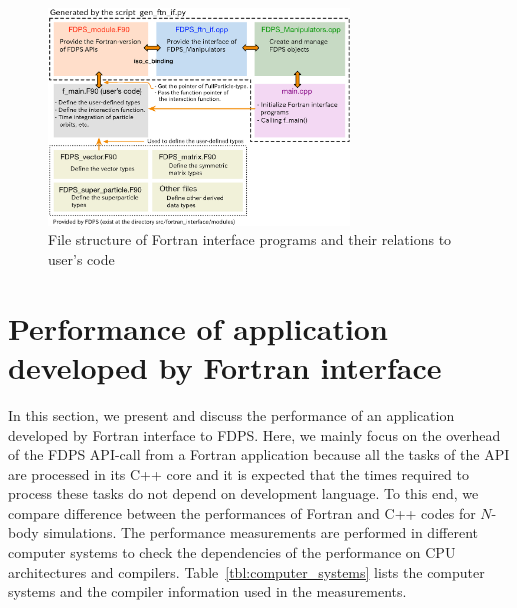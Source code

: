 \documentclass[proof,useamsfonts]{pasj01}
\begin{document}


\begin{figure}[h]
\begin{center}
\includegraphics[width=8cm]{figures/FDPS_ftn_if_file_str}
\end{center}
\caption{File structure of Fortran interface programs and their relations to user’s code}
\label{fig:file_str_ftn_if}  
\end{figure}




\section{Performance of application developed by Fortran interface}
\label{sec:performance}
In this section, we present and discuss the performance of an application developed by Fortran interface to FDPS. Here, we mainly focus on the overhead of the FDPS API-call from a Fortran application because all the tasks of the API are processed in its C++ core and it is expected that the times required to process these tasks do not depend on development language. To this end, we compare difference between the performances of Fortran and C++ codes for $N$-body simulations. The performance measurements are performed in different computer systems to check the dependencies of the performance on CPU architectures and compilers. Table~\ref{tbl:computer_systems} lists the computer systems and the compiler information used in the measurements.
\end{document}
